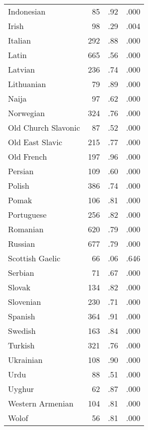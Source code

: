 \begin{longtable}{lrrr}
    Indonesian & 85 & .92 & .000 \\
    Irish & 98 & .29 & .004 \\
    Italian & 292 & .88 & .000 \\
    Latin & 665 & .56 & .000 \\
    Latvian & 236 & .74 & .000 \\
    Lithuanian & 79 & .89 & .000 \\
    Naija & 97 & .62 & .000 \\
    Norwegian & 324 & .76 & .000 \\
    Old Church Slavonic & 87 & .52 & .000 \\
    Old East Slavic & 215 & .77 & .000 \\
    Old French & 197 & .96 & .000 \\
    Persian & 109 & .60 & .000 \\
    Polish & 386 & .74 & .000 \\
    Pomak & 106 & .81 & .000 \\
    Portuguese & 256 & .82 & .000 \\
    Romanian & 620 & .79 & .000 \\
    Russian & 677 & .79 & .000 \\
    Scottish Gaelic & 66 & .06 & .646 \\
    Serbian & 71 & .67 & .000 \\
    Slovak & 134 & .82 & .000 \\
    Slovenian & 230 & .71 & .000 \\
    Spanish & 364 & .91 & .000 \\
    Swedish & 163 & .84 & .000 \\
    Turkish & 321 & .76 & .000 \\
    Ukrainian & 108 & .90 & .000 \\
    Urdu & 88 & .51 & .000 \\
    Uyghur & 62 & .87 & .000 \\
    Western Armenian & 104 & .81 & .000 \\
    Wolof & 56 & .81 & .000 \\    
\end{longtable}



